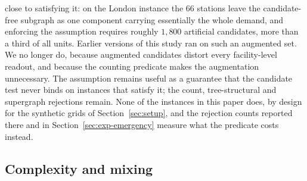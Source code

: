 \documentclass[11pt]{article}
\theoremstyle{definition}
\begin{document}
close to satisfying it: on the London instance the $66$ stations leave the
candidate-free subgraph as one component carrying essentially the whole
demand, and enforcing the assumption requires roughly $1{,}800$ artificial
candidates, more than a third of all units. Earlier versions of this study ran on such an augmented set. We no longer do, because augmented candidates distort every facility-level readout, and because the counting predicate makes the augmentation unnecessary. The assumption remains useful as a guarantee that the candidate test never binds on instances that satisfy it; the count, tree-structural and supergraph rejections remain. None of the instances in this paper does, by design for the synthetic grids of Section~\ref{sec:setup}, and the rejection counts reported there and in Section~\ref{sec:exp-emergency} measure what the predicate costs instead.

\subsection{Complexity and mixing}
\label{sec:convergence-status}
\end{document}
